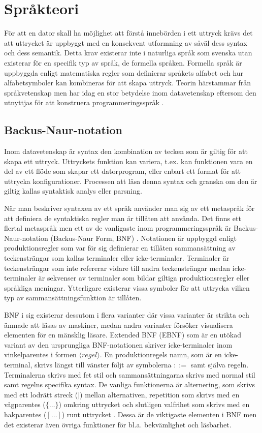 \section{Språkteori}

För att en dator skall ha möjlighet att förstå innebörden i ett uttryck krävs
det att uttrycket är uppbyggt med en konsekvent utformning av såväl dess
syntax och dess semantik. Detta krav existerar inte i naturliga språk som
svenska utan existerar för en specifik typ av språk, de formella språken.
Formella språk är uppbyggda enligt matematiska regler som definierar språkets
alfabet och hur alfabetsymboler kan kombineras för att skapa uttryck. Teorin
härstammar från språkvetenskap men har idag en stor betydelse inom
datavetenskap eftersom den utnyttjas för att konstruera programmeringsspråk
\citep[s. 41]{sm09}.

\subsection{Backus-Naur-notation}

Inom datavetenskap är syntax den kombination av tecken som är giltig för att
skapa ett uttryck. Uttryckets funktion kan variera, t.ex. kan funktionen
vara en del av ett flöde som skapar ett datorprogram, eller enbart ett format
för att uttrycka konfigurationer. Processen att läsa denna syntax och granska
om den är giltig kallas syntaktisk analys eller parsning.

När man beskriver syntaxen av ett språk använder man sig av ett metaspråk för
att definiera de syntaktiska regler man är tillåten att använda. Det finns ett
flertal metaspråk men ett av de vanligaste inom programmeringsspråk är
Backus-Naur-notation (Backus-Naur Form, BNF) \citep[s. 27]{gd08}. Notationen är uppbyggd enligt
produktionsregler som var för sig definierar en tillåten sammansättning av
teckensträngar som kallas terminaler eller icke-terminaler. Terminaler är
teckensträngar som inte refererar vidare till andra teckensträngar medan
icke-terminaler är sekvenser av terminaler som bildar giltiga
produktionsregler eller språkliga meningar. Ytterligare existerar vissa
symboler för att uttrycka vilken typ av sammansättningsfunktion är tillåten.

BNF i sig existerar dessutom i flera varianter där vissa varianter är strikta och
ämnade att läsas av maskiner, medan andra varianter försöker visualisera elementen
för en mänsklig läsare. Extended BNF (EBNF) som är en utökad variant av den
ursprungliga BNF-notationen skriver icke-terminaler inom vinkelparentes i
formen ${\langle}regel{\rangle}$. En produktionregels namn, som är en
icke-terminal,
skrivs längst till vänster följt av symbolerna $::=$ samt själva regeln.
Terminalerna skrivs med fet stil och sammansättningarna skrivs med normal
stil samt regelns specifika syntax. De vanliga funktionerna är alternering, som
skrivs med ett lodrätt streck ($|$) mellan alternativen, repetition som skrivs
med en vågparentes ($\{ \ldots \}$) omkring uttrycket och slutligen
valfrihet som skrivs med en hakparentes ($[ \ldots ]$) runt uttrycket
\citep[s. 28]{gd08}. Dessa är de viktigaste elementen i BNF men det existerar
även övriga funktioner för bl.a. bekvämlighet och läsbarhet.

